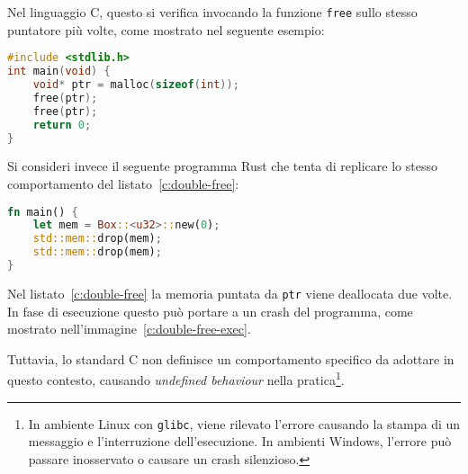 Nel linguaggio C, questo si verifica invocando la funzione \texttt{free} sullo stesso puntatore più volte, come mostrato 
nel seguente esempio:
\begin{samepage}
\begin{lstlisting}[language=C, caption={Double free in C}, label={c:double-free}]
#include <stdlib.h>
int main(void) {
    void* ptr = malloc(sizeof(int));
    free(ptr);
    free(ptr);
    return 0;
}
\end{lstlisting}
\end{samepage}
Si consideri invece il seguente programma Rust che tenta di replicare lo stesso comportamento del listato~\ref{c:double-free}:
\begin{lstlisting}[language=Rust, caption={Double free in Rust}, label={rust:double-free}]
fn main() {
    let mem = Box::<u32>::new(0);
    std::mem::drop(mem);
    std::mem::drop(mem);
}
\end{lstlisting}
Nel listato~\ref{c:double-free} la memoria puntata da \texttt{ptr} viene deallocata due volte.
In fase di esecuzione questo può portare a un crash del programma, come mostrato nell'immagine~\ref{c:double-free-exec}.

Tuttavia, lo standard C non definisce un comportamento specifico da adottare in questo contesto, causando 
\textit{undefined behaviour} nella pratica\footnote{In ambiente Linux con \texttt{glibc}, viene rilevato l'errore causando
 la stampa di un messaggio e l'interruzione dell'esecuzione. In ambienti Windows, l'errore può passare inosservato o causare un crash silenzioso.}.

